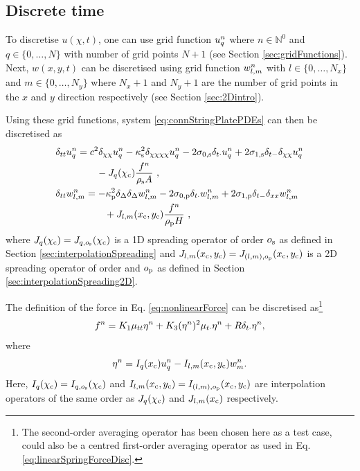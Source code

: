 \subsection{Discrete time}
To discretise $u(\chi, t)$, one can use grid function $u_q^n$ where $n\in\mathbb{N}^0$ and $q\in\{0, \hdots, N\}$ with number of grid points $N+1$ (see Section \ref{sec:gridFunctions}). Next, $w(x, y, t)$ can be discretised using grid function $w_{l,m}^n$ with $l \in \{0, \hdots, N_x\}$ and $m \in \{0, \hdots, N_y\}$ where $N_x+1$ and $N_y+1$ are the number of grid points in the $x$ and $y$ direction respectively (see Section \ref{sec:2Dintro}). 

Using these grid functions, system \eqref{eq:connStringPlatePDEs} can then be discretised as
\begin{align}\label{eq:connStringPlateFDSs}
    &\begin{aligned}
        \dtt \uqn &= c^2 \dcc \uqn - \kappa_\stxt^2 \dcccc \uqn - 2\szX[\stxt]\dtd \uqn + 2\soX[\stxt] \dtm\dcc \uqn \\
        &\qquad - J_q(\chi_\ctxt)\frac{f^n}{\rho_\stxt A}\ ,
    \end{aligned}\\
    &\begin{aligned}
        \dtt \wlmn &= -\kappa_\ptxt^2\dDelta\dDelta \wlmn - 2\szX[\ptxt]\dtd \wlmn + 2\soX[\ptxt] \dtm\dxx \wlmn \\
        &\qquad + J_{l, m}(x_\ctxt, y_\ctxt)\frac{f^n}{\rho_\ptxt H}\ ,
    \end{aligned}
\end{align}
where $J_q(\chi_{\text{c}}) = J_{q, o_{\text{s}}} (\chi_{\text{c}})$ is a 1D spreading operator of order $o_{\text{s}}$ as defined in Section \ref{sec:interpolationSpreading} and $J_{l, m}(x_{\text{c}}, y_{\text{c}}) = J_{(l, m), o_{\text{p}}}(x_{\text{c}}, y_{\text{c}})$ is a 2D spreading operator of order and $o_{\text{p}}$ as defined in Section \ref{sec:interpolationSpreading2D}. 

The definition of the force in Eq. \eqref{eq:nonlinearForce} can be discretised as\footnote{The second-order averaging operator has been chosen here as a test case, could also be a centred first-order averaging operator as used in Eq.\eqref{eq:linearSpringForceDisc}.}
\begin{equation}\label{eq:discForceStringPlate}
    f^n = K_1\mu_{tt}\eta^n+K_3(\eta^n)^2\mu_{t\cdot}\eta^n+R\delta_{t\cdot}\eta^n,
\end{equation}
where
\begin{equation}\label{eq:discEtaStringPlate}
    \eta^n = I_q(x_{\text{c}})u_q^n - I_{l, m}(x_{\text{c}}, y_{\text{c}})w_m^n.
\end{equation}
Here, $I_q(\chi_{\text{c}}) = I_{q, o_{\text{s}}} (\chi_{\text{c}})$ and $I_{l, m}(x_{\text{c}}, y_{\text{c}}) = I_{(l, m), o_{\text{p}}}(x_{\text{c}}, y_{\text{c}})$ are interpolation operators of the same order as $J_q(\chi_{\text{c}})$ and $J_{l,m}(x_{\text{c}})$ respectively. 


